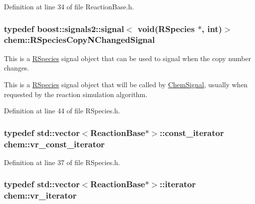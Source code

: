 Definition at line 34 of file Reaction\-Base.\-h.

\hypertarget{namespacechem_a6cb4144586460e7b7ae0dffdf08eb57c}{
\subsubsection[{R\-Species\-Copy\-N\-Changed\-Signal}]{\setlength{\rightskip}{0pt plus 5cm}typedef boost\-::signals2\-::signal$<$ void({\bf R\-Species} $\ast$, int)$>$ {\bf chem\-::\-R\-Species\-Copy\-N\-Changed\-Signal}}}\label{namespacechem_a6cb4144586460e7b7ae0dffdf08eb57c}


This is a \hyperlink{classchem_1_1RSpecies}{R\-Species} signal object that can be used to signal when the copy number changes. 

This is a \hyperlink{classchem_1_1RSpecies}{R\-Species} signal object that will be called by \hyperlink{classchem_1_1ChemSignal}{Chem\-Signal}, usually when requested by the reaction simulation algorithm. 

Definition at line 44 of file R\-Species.\-h.

\hypertarget{namespacechem_a37ac14ea0688e0f1bc93f320f1240a74}{
\subsubsection[{vr\-\_\-const\-\_\-iterator}]{\setlength{\rightskip}{0pt plus 5cm}typedef std\-::vector$<${\bf Reaction\-Base}$\ast$$>$\-::const\-\_\-iterator {\bf chem\-::vr\-\_\-const\-\_\-iterator}}}\label{namespacechem_a37ac14ea0688e0f1bc93f320f1240a74}


Definition at line 37 of file R\-Species.\-h.

\hypertarget{namespacechem_a0decff3bb0047ac3a45bc12163f063e4}{
\subsubsection[{vr\-\_\-iterator}]{\setlength{\rightskip}{0pt plus 5cm}typedef std\-::vector$<${\bf Reaction\-Base}$\ast$$>$\-::iterator {\bf chem\-::vr\-\_\-iterator}}}\label{namespacechem_a0decff3bb0047ac3a45bc12163f063e4}


